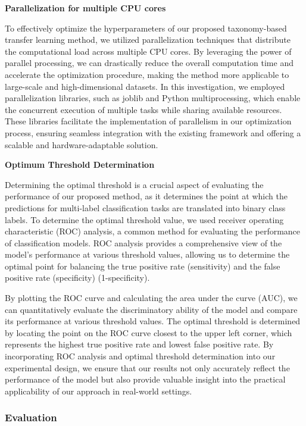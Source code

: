 \textbf{Parallelization for multiple CPU cores}

To effectively optimize the hyperparameters of our proposed taxonomy-based transfer learning method, we utilized parallelization techniques that distribute the computational load across multiple CPU cores. By leveraging the power of parallel processing, we can drastically reduce the overall computation time and accelerate the optimization procedure, making the method more applicable to large-scale and high-dimensional datasets. In this investigation, we employed parallelization libraries, such as joblib and Python multiprocessing, which enable the concurrent execution of multiple tasks while sharing available resources. These libraries facilitate the implementation of parallelism in our optimization process, ensuring seamless integration with the existing framework and offering a scalable and hardware-adaptable solution.


\textbf{Optimum Threshold Determination}

Determining the optimal threshold is a crucial aspect of evaluating the performance of our proposed method, as it determines the point at which the predictions for multi-label classification tasks are translated into binary class labels. To determine the optimal threshold value, we used receiver operating characteristic (ROC) analysis, a common method for evaluating the performance of classification models. ROC analysis provides a comprehensive view of the model's performance at various threshold values, allowing us to determine the optimal point for balancing the true positive rate (sensitivity) and the false positive rate (specificity) (1-specificity).

By plotting the ROC curve and calculating the area under the curve (AUC), we can quantitatively evaluate the discriminatory ability of the model and compare its performance at various threshold values. The optimal threshold is determined by locating the point on the ROC curve closest to the upper left corner, which represents the highest true positive rate and lowest false positive rate. By incorporating ROC analysis and optimal threshold determination into our experimental design, we ensure that our results not only accurately reflect the performance of the model but also provide valuable insight into the practical applicability of our approach in real-world settings.


\subsubsection{Evaluation}

